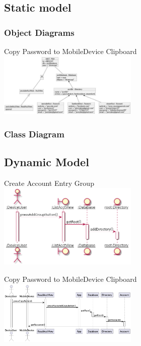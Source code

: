 \documentclass[stu]{apa7}
\begin{document}
{{{{\subsection{Static model}

\subsubsection{Object Diagrams}

Copy Password to MobileDevice Clipboard \\
\includegraphics[width=0.5\textwidth]{diag/rjm/o1.jpg}

\subsubsection{Class Diagram}

\subsection{Dynamic Model}

Create Account Entry Group \\
\includegraphics[width=0.5\textwidth]{diag/gt/s1.png}

Copy Password to MobileDevice Clipboard \\
\includegraphics[width=0.5\textwidth]{diag/rjm/s1.png}

%
%
%
%

}}}}
\end{document}
